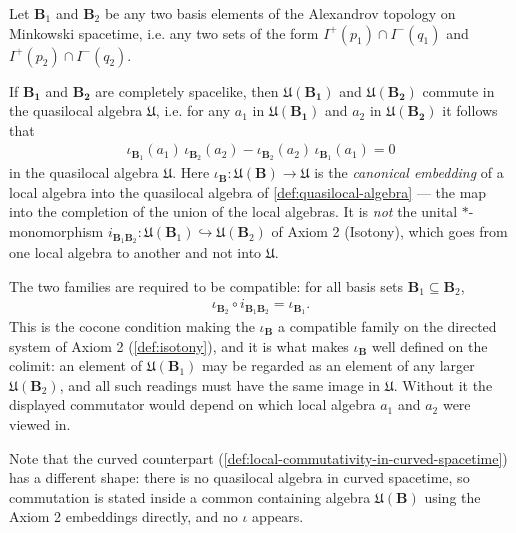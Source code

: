 \begin{definition}
    \label{def:local-commutativity}
    \leanok
    Let $\mathbf{B}_1$ and $\mathbf{B}_2$ be any two basis elements of the Alexandrov topology on Minkowski spacetime, i.e. any two sets of the form $I^+(p_1) \cap I^-(q_1)$ and $I^+(p_2) \cap I^-(q_2)$.

    If $\mathbf{B_1}$ and $\mathbf{B_2}$ are completely spacelike, then $\mathfrak{U}(\mathbf{B_1})$ and $\mathfrak{U}(\mathbf{B_2})$ commute in the quasilocal algebra $\mathfrak{U}$, i.e. for any $a_1$ in $\mathfrak{U}(\mathbf{B_1})$ and $a_2$ in $\mathfrak{U}(\mathbf{B_2})$ it follows that
    \begin{align}
        \iota_{\mathbf{B}_1}(a_1)\, \iota_{\mathbf{B}_2}(a_2) - \iota_{\mathbf{B}_2}(a_2)\, \iota_{\mathbf{B}_1}(a_1) = 0
    \end{align}
    in the quasilocal algebra $\mathfrak{U}$. Here $\iota_{\mathbf{B}} : \mathfrak{U}(\mathbf{B}) \to \mathfrak{U}$ is the \emph{canonical embedding} of a local algebra into the quasilocal algebra of \ref{def:quasilocal-algebra} --- the map into the completion of the union of the local algebras. It is \emph{not} the unital $*$-monomorphism $i_{\mathbf{B}_1\mathbf{B}_2} : \mathfrak{U}(\mathbf{B}_1) \hookrightarrow \mathfrak{U}(\mathbf{B}_2)$ of Axiom 2 (Isotony), which goes from one local algebra to another and not into $\mathfrak{U}$.

    The two families are required to be compatible: for all basis sets $\mathbf{B}_1 \subseteq \mathbf{B}_2$,
    \begin{align}
        \iota_{\mathbf{B}_2} \circ i_{\mathbf{B}_1\mathbf{B}_2} = \iota_{\mathbf{B}_1}.
    \end{align}
    This is the cocone condition making the $\iota_{\mathbf{B}}$ a compatible family on the directed system of Axiom 2 (\ref{def:isotony}), and it is what makes $\iota_{\mathbf{B}}$ well defined on the colimit: an element of $\mathfrak{U}(\mathbf{B}_1)$ may be regarded as an element of any larger $\mathfrak{U}(\mathbf{B}_2)$, and all such readings must have the same image in $\mathfrak{U}$. Without it the displayed commutator would depend on which local algebra $a_1$ and $a_2$ were viewed in.

    Note that the curved counterpart (\ref{def:local-commutativity-in-curved-spacetime}) has a different shape: there is no quasilocal algebra in curved spacetime, so commutation is stated inside a common containing algebra $\mathfrak{U}(\mathbf{B})$ using the Axiom 2 embeddings directly, and no $\iota$ appears.
\end{definition}

